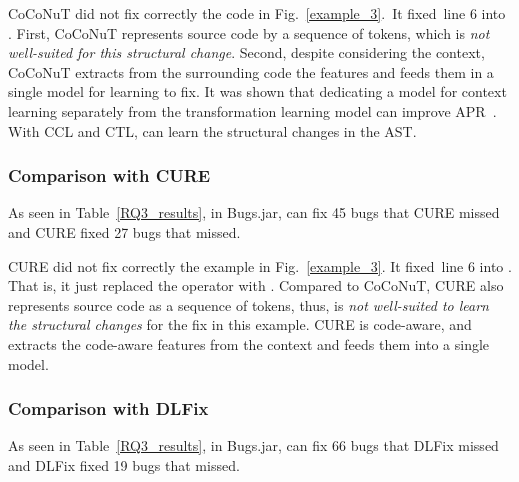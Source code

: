 CoCoNuT did not fix correctly the code in Fig.~\ref{example_3}.~It
fixed~line 6 into   
 \code{());}. First, CoCoNuT represents source code by
a sequence of tokens, which is {\em not well-suited for this
  structural change}. Second, despite considering the context, CoCoNuT
extracts from the surrounding code the features and feeds them in a
single model for learning to fix.
%
It was shown that dedicating a model for context learning separately
from the transformation learning model can improve APR~\cite{icse20}.
With CCL and CTL, {\tool} can learn the structural changes in the AST.

\subsubsection{\bf Comparison with CURE}

As seen in Table~\ref{RQ3_results}, in Bugs.jar, {\tool} can fix 45
bugs that CURE missed and CURE fixed 27 bugs that {\tool} missed.

CURE did not fix correctly the example in Fig.~\ref{example_3}. It
fixed~line 6 into 
  \code{/} .
That is, it just replaced the operator \code{\%} with \code{/}.
Compared to CoCoNuT, CURE also represents source code as a sequence of
tokens, thus, is {\em not well-suited to learn the structural changes} for
the fix in this example. CURE is code-aware,
and extracts the code-aware features from the context and feeds them
into a single model.

\subsubsection{\bf Comparison with DLFix}

As seen in Table~\ref{RQ3_results}, in Bugs.jar, {\tool} can fix 66
bugs that DLFix missed and DLFix fixed 19 bugs that {\tool}
missed.

